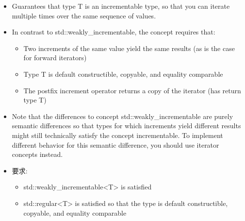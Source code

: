 \begin{itemize}
\item
Guarantees that type T is an incrementable type, so that you can iterate multiple times over the same sequence of values.

\item
In contrast to std::weakly\_incrementable, the concept requires that:

\begin{itemize}
\item
Two increments of the same value yield the same results (as is the case for forward iterators)

\item
Type T is default constructible, copyable, and equality comparable

\item
The postfix increment operator returns a copy of the iterator (has return type T)
\end{itemize}

\item
Note that the differences to concept std::weakly\_incrementable are purely semantic differences so that types for which increments yield different results might still technically satisfy the concept incrementable. To implement different behavior for this semantic difference, you should use iterator concepts instead.

\item
要求:
\begin{itemize}
\item
std::weakly\_incrementable<T> is satisfied

\item
std::regular<T> is satisfied so that the type is default constructible, copyable, and equality comparable
\end{itemize}
\end{itemize}
